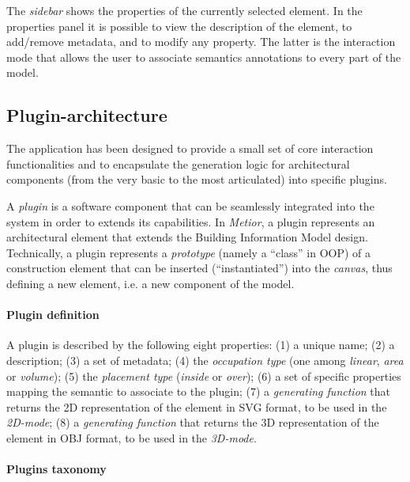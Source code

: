 The \emph{sidebar} shows the properties of the currently selected element.
In the properties panel it is possible to view the description of the element, to add/remove metadata, and to modify any property. The latter is the interaction mode that allows the user to associate semantics annotations to every part of the model.

\vspace{-3mm}\subsection{Plugin-architecture}\vspace{-3mm}

\noindent The application has been designed to provide a small set of core interaction functionalities and to encapsulate the generation logic for architectural components (from the very basic to the most articulated) into specific plugins.

A \emph{plugin} is a software component that can be seamlessly integrated into the system in order to extends its capabilities.
In \emph{Metior}, a plugin represents an architectural element that extends the Building Information Model design.
Technically, a plugin represents a \emph{prototype} (namely a ``class'' in OOP) of a construction element that can be inserted (``instantiated'') into the \emph{canvas}, thus defining a new element, i.e. a new component of the model.

\vspace{-3mm}\paragraph{Plugin definition}

A plugin is described by the following eight properties: (1) a unique name; (2) a description; (3) a set of metadata; (4) the \emph{occupation type} (one among \emph{linear}, \emph{area} or \emph{volume}); (5) the \emph{placement type} (\emph{inside} or \emph{over}); (6) a set of specific properties mapping the semantic to associate to the plugin; (7) a \emph{generating function} that returns the 2D representation of the element in SVG format, to be used in the \emph{2D-mode}; (8) a \emph{generating function} that returns the 3D representation of the element in OBJ format, to be used in the \emph{3D-mode}.

\vspace{-3mm}\paragraph{Plugins taxonomy}\label{ssec:taxonomy}

